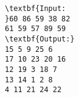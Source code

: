 \begin{verbatim}
\textbf{Input:
}60 86 59 38 82 
61 59 57 89 59
\textbf{Output:}
15 5 9 25 6 
17 10 23 20 16 
12 19 3 18 7 
13 14 1 2 8 
4 11 21 24 22 
\end{verbatim}